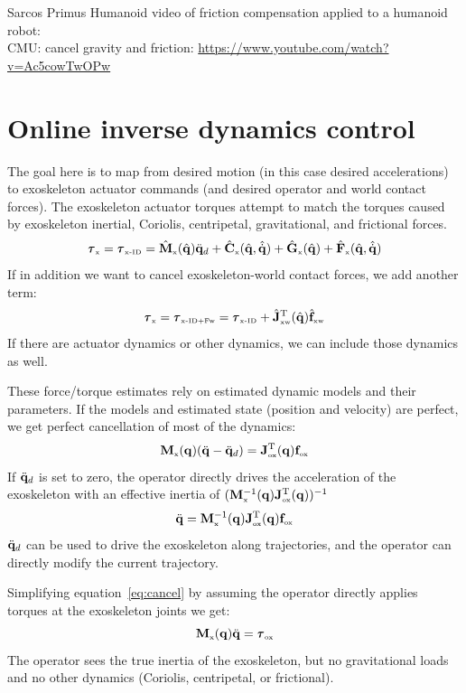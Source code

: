 \documentclass[letterpaper,12pt,fullpage]{article}
\newcommand{\myx}{{\mbox {\tiny x}}}
\newcommand{\ox}{{\mbox {\tiny ox}}}
\newcommand{\xw}{{\mbox {\tiny xw}}}
\newcommand{\xinvdyn}{{\mbox {\tiny x-ID}}}
\newcommand{\xinvdynw}{{\mbox {\tiny x-ID+Fw}}}
\begin{document}
Sarcos Primus Humanoid video of friction compensation applied
to a humanoid robot:\\
CMU: cancel gravity and friction: \url{https://www.youtube.com/watch?v=Ac5cowTwOPw}\\

\section{Online inverse dynamics control}
\label{sec:invdyn}

The goal here is to map from desired motion (in this case desired
accelerations) to exoskeleton actuator commands (and desired operator
and world contact forces).
The exoskeleton actuator torques
attempt to match the torques caused by exoskeleton inertial, Coriolis, centripetal,
gravitational, and frictional forces.
\begin{equation}
\vtau_{\myx} = \vtau_{\xinvdyn} 
= \hat{\mM}_{\myx}(\hat{\vq}) \ddot{\vq}_d
+ \hat{\mC}_{\myx}(\hat{\vq},\hat{\dot{\vq}})
+ \hat{\mG}_{\myx}(\hat{\vq})
+ \hat{\mF}_{\myx}(\hat{\vq},\hat{\dot{\vq}})
\end{equation}
If in addition we want to cancel exoskeleton-world contact forces,
we add another term:
\begin{equation}
\vtau_{\myx} = \vtau_{\xinvdynw} = \vtau_{\xinvdyn} 
+ \hat{\mJ}_{\xw}^{\tr}(\hat{\vq}) \hat{\vf}_{\xw}
\end{equation}
If there are actuator dynamics or other dynamics, we can include those
dynamics as well.

These force/torque estimates rely on estimated dynamic models and their parameters.
If the models and estimated state (position and velocity) are perfect, we get
perfect cancellation of most of the dynamics:
\begin{equation}
\mM_{\myx}(\vq) (\ddot{\vq} - \ddot{\vq}_d) = \mJ_{\ox}^{\tr}(\vq) \vf_{\ox}
\end{equation}
If $\ddot{{\bf q}}_d$ is set to zero, the operator directly drives the acceleration
of the exoskeleton with an effective inertia of 
$(\mM^{-1}_{\myx}(\vq) \mJ_{\ox}^{\tr}(\vq))^{-1}$
\begin{equation}
\ddot{\vq} = \mM^{-1}_{\myx}(\vq) \mJ_{\ox}^{\tr}(\vq) \vf_{\ox}
\label{eq:cancel}
\end{equation}
$\ddot{{\bf q}}_d$ can be used to drive the exoskeleton along trajectories, and
the operator can directly modify the current trajectory.

Simplifying equation~\ref{eq:cancel} by 
assuming the operator directly applies torques at the
exoskeleton joints we get:
\begin{equation}
\mM_{\myx} (\vq) \ddot{\vq} = \vtau_{\ox}
\end{equation}
The operator sees the true inertia of the exoskeleton, but no gravitational
loads and no other dynamics (Coriolis, centripetal, or frictional).
\end{document}
